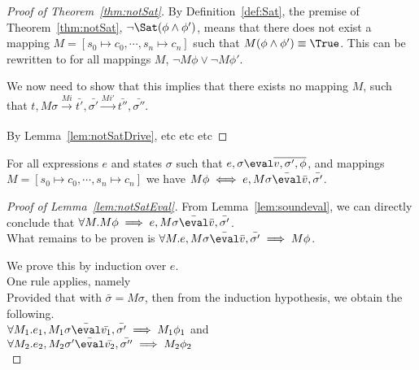 
\onecolumn



\begin{proof}[Proof of Theorem~\ref{thm:notSat}]
  By Definition~\ref{def:Sat}, the premise of Theorem~\ref{thm:notSat}, $\neg\Sat(\phi\land\phi')$,
  means that there does not exist a mapping $M=[s_0\mapsto c_0,\cdots,s_n\mapsto c_n]$ such that $M(\phi\land\phi')\equiv\True$.
  This can be rewritten to for all mappings $M$, $\neg M\phi \lor \neg M\phi'$.

  We now need to show that this implies that there exists no mapping $M$,
  such that $t,M\sigma\xrightarrow[]{Mi}\bar{t'},\bar{\sigma'}\xrightarrow[]{Mi'}\bar{t''},\bar{\sigma''}$.

  By Lemma~\ref{lem:notSatDrive}, etc etc etc 
\end{proof}

\begin{lemma}
  \label{lem:notSatEval}
  For all expressions $e$ and states $\sigma$ such that $e,\sigma\eval\overline{v,\sigma',\phi}$, and mappings $M=[s_0\mapsto c_0,\cdots,s_n\mapsto c_n]$ we have $M\phi \iff e,M\sigma\bar{\eval}\bar{v},\bar{\sigma'}$.

\end{lemma}

\begin{proof}[Proof of Lemma~\ref{lem:notSatEval}]
  From Lemma~\ref{lem:soundeval}, we can directly conclude that $\forall M . M\phi \implies e,M\sigma\bar{\eval}\bar{v},\bar{\sigma'}$.\\
  What remains to be proven is $\forall M . e,M\sigma\bar{\eval}\bar{v},\bar{\sigma'}\implies M\phi$.

  We prove this by induction over $e$.\\

    {
      One rule applies, namely \\
      Provided that  with $\bar{\sigma}=M\sigma$, then from the induction hypothesis, we obtain the following.\\

      $\forall M_1 . e_1,M_1\sigma\bar{\eval}\bar{v_1},\bar{\sigma'}\implies M_1\phi_1$ and\\
      $\forall M_2 . e_2,M_2\sigma'\bar{\eval}\bar{v_2},\bar{\sigma''}\implies M_2\phi_2$\\

    }

\end{proof}

